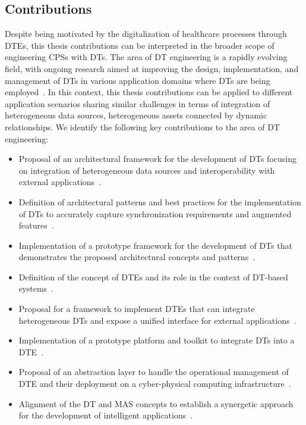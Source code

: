 \subsection*{Contributions}

Despite being motivated by the digitalization of healthcare processes through \acp{DTE}, this thesis contributions can be interpreted in the broader scope of engineering \acp{CPS} with \acp{DT}.
%
The area of \ac{DT} engineering is a rapidly evolving field, with ongoing research aimed at improving the design, implementation, and management of \acp{DT} in various application domains where \acp{DT} are being employed~\missingref{}.
%
In this context, this thesis contributions can be applied to different application scenarios sharing similar challenges in terms of integration of heterogeneous data sources, heterogeneous assets connected by dynamic relationships.
We identify the following key contributions to the area of \ac{DT} engineering:
\begin{itemize}
  \item Proposal of an architectural framework for the development of \acp{DT} focusing on integration of heterogeneous data sources and interoperability with external applications~\missingref{}.
  \item Definition of architectural patterns and best practices for the implementation of \acp{DT} to accurately capture synchronization requirements and augmented features~\missingref{}.
  \item Implementation of a prototype framework for the development of \acp{DT} that demonstrates the proposed architectural concepts and patterns~\missingref{}.
  \item Definition of the concept of \acp{DTE} and its role in the context of \ac{DT}-based systems~\missingref{}.
  \item Proposal for a framework to implement \acp{DTE} that can integrate heterogeneous \acp{DT} and expose a unified interface for external applications~\missingref{}.
  \item Implementation of a prototype platform and toolkit to integrate \acp{DT} into a \ac{DTE}~\missingref{}.
  \item Proposal of an abstraction layer to handle the operational management of \ac{DTE} and their deployment on a cyber-physical computing infrastructure~\missingref{}.
  \item Alignment of the \ac{DT} and \ac{MAS} concepts to establish a synergetic approach for the development of intelligent applications~\missingref{}.
\end{itemize}

